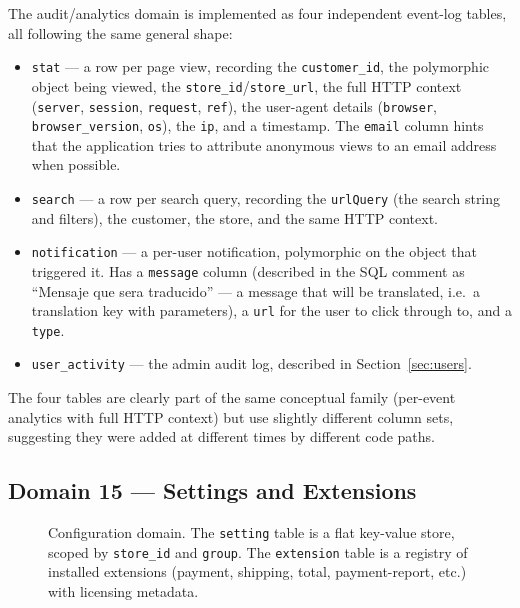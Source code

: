 \documentclass[11pt,a4paper]{article}
\begin{document}
The audit/analytics domain is implemented as four independent
event-log tables, all following the same general shape:

\begin{itemize}[leftmargin=1.6em,itemsep=2pt]
  \item \texttt{stat} --- a row per page view, recording the
        \texttt{customer\_id}, the polymorphic object being
        viewed, the \texttt{store\_id}/\texttt{store\_url},
        the full HTTP context (\texttt{server}, \texttt{session},
        \texttt{request}, \texttt{ref}), the user-agent
        details (\texttt{browser}, \texttt{browser\_version},
        \texttt{os}), the \texttt{ip}, and a timestamp. The
        \texttt{email} column hints that the application
        tries to attribute anonymous views to an email
        address when possible.
  \item \texttt{search} --- a row per search query, recording
        the \texttt{urlQuery} (the search string and filters),
        the customer, the store, and the same HTTP context.
  \item \texttt{notification} --- a per-user notification,
        polymorphic on the object that triggered it. Has a
        \texttt{message} column (described in the SQL comment
        as ``Mensaje que sera traducido'' --- a message that
        will be translated, i.e.\ a translation key with
        parameters), a \texttt{url} for the user to click
        through to, and a \texttt{type}.
  \item \texttt{user\_activity} --- the admin audit log,
        described in Section~\ref{sec:users}.
\end{itemize}

The four tables are clearly part of the same conceptual
family (per-event analytics with full HTTP context) but use
slightly different column sets, suggesting they were added
at different times by different code paths.

\subsection{Domain 15 --- Settings and Extensions}\label{sec:settings}

\begin{figure}[htbp]
\centering
{}
\caption{Configuration domain. The \texttt{setting} table is a
flat key-value store, scoped by \texttt{store\_id} and
\texttt{group}. The \texttt{extension} table is a registry of
installed extensions (payment, shipping, total, payment-report,
etc.) with licensing metadata.}
\label{fig:settings}
\end{figure}
\end{document}
